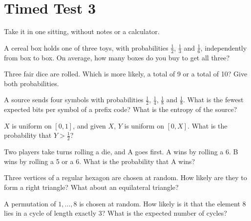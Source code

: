 \chapter{Timed Test 3}\label{ch:iv1:timed-test-3}

\begin{ivtrains}
Take it in one sitting, without notes or a calculator.
\end{ivtrains}


\begin{question}\label{iq:iv1:timed-test-3:1}
A cereal box holds one of three toys, with probabilities $\frac12$, $\frac13$ and $\frac16$, independently from box to box. On average, how many boxes do you buy to get all three?
\end{question}

\begin{question}\label{iq:iv1:timed-test-3:2}
Three fair dice are rolled. Which is more likely, a total of 9 or a total of 10? Give both probabilities.
\end{question}

\begin{question}\label{iq:iv1:timed-test-3:3}
A source sends four symbols with probabilities $\frac12$, $\frac14$, $\frac18$ and $\frac18$. What is the fewest expected bits per symbol of a prefix code? What is the entropy of the source?
\end{question}

\begin{question}\label{iq:iv1:timed-test-3:4}
$X$ is uniform on $[0, 1]$, and given $X$, $Y$ is uniform on $[0, X]$. What is the probability that $Y > \frac12$?
\end{question}

\begin{question}\label{iq:iv1:timed-test-3:5}
Two players take turns rolling a die, and A goes first. A wins by rolling a 6. B wins by rolling a 5 or a 6. What is the probability that A wins?
\end{question}

\begin{question}\label{iq:iv1:timed-test-3:6}
Three vertices of a regular hexagon are chosen at random. How likely are they to form a right triangle? What about an equilateral triangle?
\end{question}


\begin{question}\label{iq:iv1:timed-test-3:7}
A permutation of $1, \dots, 8$ is chosen at random. How likely is it that the element 8 lies in a cycle of length exactly 3? What is the expected number of cycles?
\end{question}

